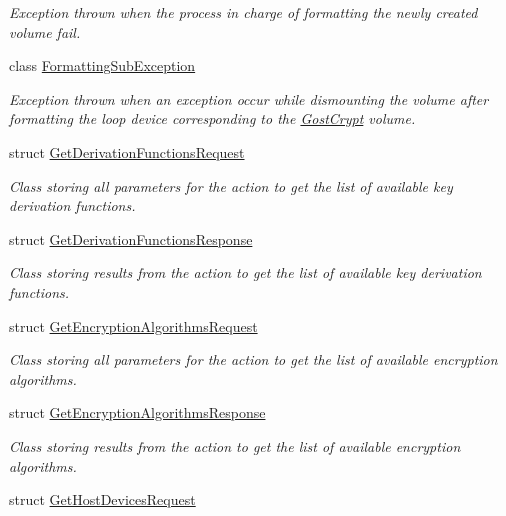 \begin{DoxyCompactItemize}
\begin{DoxyCompactList}\small\item\em Exception thrown when the process in charge of formatting the newly created volume fail. \end{DoxyCompactList}\item 
class \hyperlink{class_gost_crypt_1_1_core_1_1_formatting_sub_exception}{Formatting\+Sub\+Exception}
\begin{DoxyCompactList}\small\item\em Exception thrown when an exception occur while dismounting the volume after formatting the loop device corresponding to the \hyperlink{namespace_gost_crypt}{Gost\+Crypt} volume. \end{DoxyCompactList}\item 
struct \hyperlink{struct_gost_crypt_1_1_core_1_1_get_derivation_functions_request}{Get\+Derivation\+Functions\+Request}
\begin{DoxyCompactList}\small\item\em Class storing all parameters for the action to get the list of available key derivation functions. \end{DoxyCompactList}\item 
struct \hyperlink{struct_gost_crypt_1_1_core_1_1_get_derivation_functions_response}{Get\+Derivation\+Functions\+Response}
\begin{DoxyCompactList}\small\item\em Class storing results from the action to get the list of available key derivation functions. \end{DoxyCompactList}\item 
struct \hyperlink{struct_gost_crypt_1_1_core_1_1_get_encryption_algorithms_request}{Get\+Encryption\+Algorithms\+Request}
\begin{DoxyCompactList}\small\item\em Class storing all parameters for the action to get the list of available encryption algorithms. \end{DoxyCompactList}\item 
struct \hyperlink{struct_gost_crypt_1_1_core_1_1_get_encryption_algorithms_response}{Get\+Encryption\+Algorithms\+Response}
\begin{DoxyCompactList}\small\item\em Class storing results from the action to get the list of available encryption algorithms. \end{DoxyCompactList}\item 
struct \hyperlink{struct_gost_crypt_1_1_core_1_1_get_host_devices_request}{Get\+Host\+Devices\+Request}

\end{DoxyCompactItemize}
